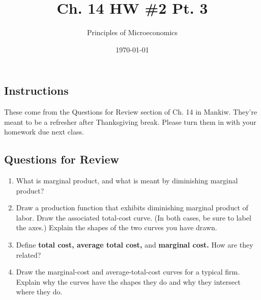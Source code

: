 \documentclass{article}
\title{Ch. 14 HW \#2 Pt. 3}
\author{Principles of Microeconomics}
\date{\today}
\begin{document}
\maketitle

\subsection*{Instructions}

These come from the Questions for Review section of Ch. 14 in Mankiw. They're meant to be a refresher after Thanksgiving break. Please turn them in with your homework due next class.

\subsection*{Questions for Review}

\begin{enumerate}

\item What is marginal product, and what is meant by diminishing marginal product?

\item Draw a production function that exhibits diminishing marginal product of labor. Draw the associated total-cost curve. (In both cases, be sure to label the axes.) Explain the shapes of the two curves you have drawn.

\item Define \textbf{total cost, average total cost,} and \textbf{marginal cost.} How are they related?

\item Draw the marginal-cost and average-total-cost curves for a typical firm. Explain why the curves have the shapes they do and why they intersect where they do.

\end{enumerate}
\end{document}
